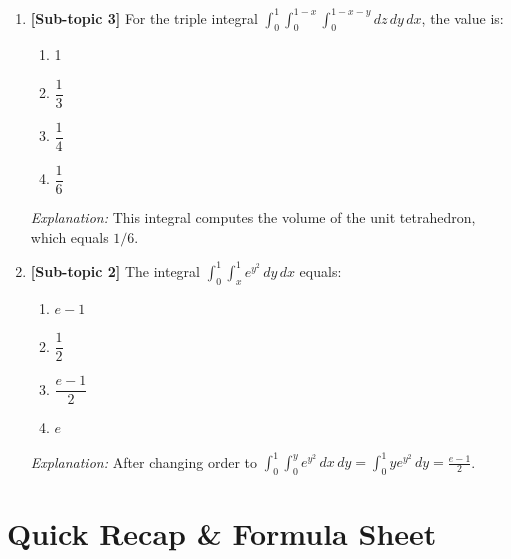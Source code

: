 \documentclass[12pt,a4paper]{article}
\begin{document}
\begin{enumerate}
  \item \textbf{[Sub-topic 3]} For the triple integral \(\displaystyle\int_0^1\int_0^{1-x}\int_0^{1-x-y} dz\,dy\,dx\), the value is:
  \begin{enumerate}[label=(\Alph*)]
    \item 1
    \item \(\dfrac{1}{3}\)
    \item \(\dfrac{1}{4}\)
    \item \textbf{\(\dfrac{1}{6}\)}
  \end{enumerate}
  \textit{Explanation:} This integral computes the volume of the unit tetrahedron, which equals \(1/6\).

  \item \textbf{[Sub-topic 2]} The integral \(\displaystyle\int_0^1\int_x^1 e^{y^2}\,dy\,dx\) equals:
  \begin{enumerate}[label=(\Alph*)]
    \item \(e-1\)
    \item \(\dfrac{1}{2}\)
    \item \textbf{\(\dfrac{e-1}{2}\)}
    \item \(e\)
  \end{enumerate}
  \textit{Explanation:} After changing order to \(\int_0^1\int_0^y e^{y^2}\,dx\,dy = \int_0^1 ye^{y^2}\,dy = \frac{e-1}{2}\).
\end{enumerate}

\section{Quick Recap \& Formula Sheet}
\end{document}
